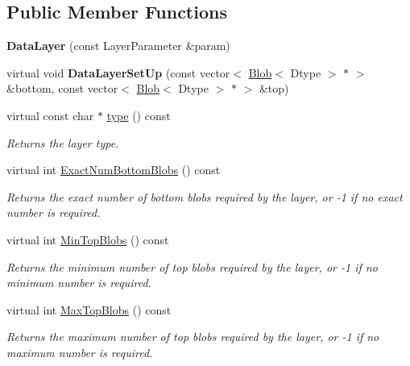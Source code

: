 \subsection*{Public Member Functions}
\begin{DoxyCompactItemize}
\item 
{\bfseries Data\+Layer} (const Layer\+Parameter \&param)\hypertarget{classcaffe_1_1DataLayer_a55d92ba6737e695551eca610868f1fae}{}\label{classcaffe_1_1DataLayer_a55d92ba6737e695551eca610868f1fae}

\item 
virtual void {\bfseries Data\+Layer\+Set\+Up} (const vector$<$ \hyperlink{classcaffe_1_1Blob}{Blob}$<$ Dtype $>$ $\ast$ $>$ \&bottom, const vector$<$ \hyperlink{classcaffe_1_1Blob}{Blob}$<$ Dtype $>$ $\ast$ $>$ \&top)\hypertarget{classcaffe_1_1DataLayer_a7c9ee1ab0a5be8030f03a5700ce42de4}{}\label{classcaffe_1_1DataLayer_a7c9ee1ab0a5be8030f03a5700ce42de4}

\item 
virtual const char $\ast$ \hyperlink{classcaffe_1_1DataLayer_a8a7454b2fc8bde3220c21b8918c9ac2a}{type} () const \hypertarget{classcaffe_1_1DataLayer_a8a7454b2fc8bde3220c21b8918c9ac2a}{}\label{classcaffe_1_1DataLayer_a8a7454b2fc8bde3220c21b8918c9ac2a}

\begin{DoxyCompactList}\small\item\em Returns the layer type. \end{DoxyCompactList}\item 
virtual int \hyperlink{classcaffe_1_1DataLayer_a41c3c270f2f1239808fbd4293e89949d}{Exact\+Num\+Bottom\+Blobs} () const 
\begin{DoxyCompactList}\small\item\em Returns the exact number of bottom blobs required by the layer, or -\/1 if no exact number is required. \end{DoxyCompactList}\item 
virtual int \hyperlink{classcaffe_1_1DataLayer_a65a81d2aff2703bf94b630ba2657b319}{Min\+Top\+Blobs} () const 
\begin{DoxyCompactList}\small\item\em Returns the minimum number of top blobs required by the layer, or -\/1 if no minimum number is required. \end{DoxyCompactList}\item 
virtual int \hyperlink{classcaffe_1_1DataLayer_a67d8d7543045833765d73c850a81941f}{Max\+Top\+Blobs} () const 
\begin{DoxyCompactList}\small\item\em Returns the maximum number of top blobs required by the layer, or -\/1 if no maximum number is required. \end{DoxyCompactList}\end{DoxyCompactItemize}
